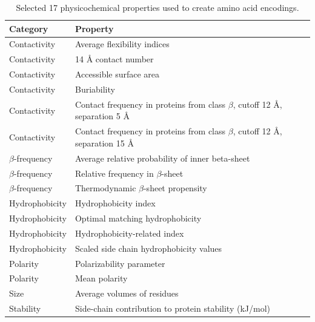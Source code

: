 \documentclass[fleqn,10pt,twoside]{gcb15submission}
\begin{document}
\begin{table}[bth]
\caption{Selected 17 physicochemical properties used to create amino acid encodings.} 
\label{tab:properties}
\small
\begin{tabularx}{\textwidth}{l X}
  \toprule
  Category & Property \\ 
  \midrule
  Contactivity & Average flexibility indices \citep{bhaskaran_positional_1988} 
\\ 
  \rowcolor[gray]{0.85}Contactivity & 14 {\AA} contact number 
\citep{nishikawa_radial_1986} \\ 
  Contactivity & Accessible surface area \citep{radzicka_comparing_1988} \\ 
  \rowcolor[gray]{0.85}Contactivity & Buriability \citep{zhou_quantifying_2004} 
\\ 
  Contactivity & Contact frequency in proteins from class $\beta$, cutoff 
12 {\AA}, separation 5 {\AA} \citep{wozniak_characteristics_2014} \\ 
  \rowcolor[gray]{0.85}Contactivity & Contact frequency in proteins from class 
$\beta$, cutoff 12 {\AA}, separation 15 {\AA}
\citep{wozniak_characteristics_2014} \\ 
\hline 
  $\beta$-frequency & Average relative probability of inner \newline beta-sheet 
\citep{kanehisa_local_1980} \\ 
  \rowcolor[gray]{0.85}$\beta$-frequency & Relative frequency in $\beta$-sheet 
\citep{prabhakaran_distribution_1990} \\ 
  $\beta$-frequency & Thermodynamic $\beta$-sheet propensity 
\citep{kim_thermodynamic_1993} \\ 
\hline 
 \rowcolor[gray]{0.85} Hydrophobicity & Hydrophobicity index 
\citep{argos_structural_1982} \\ 
  Hydrophobicity & Optimal matching hydrophobicity 
\citep{sweet_correlation_1983} \\ 
  \rowcolor[gray]{0.85}Hydrophobicity & Hydrophobicity-related index 
\citep{kidera_statistical_1985} \\ 
  Hydrophobicity & Scaled side chain hydrophobicity values 
\citep{black_development_1991} \\ 
\hline 
  \rowcolor[gray]{0.85}Polarity & Polarizability parameter 
\citep{charton_structural_1982} \\
  Polarity & Mean polarity \citep{radzicka_comparing_1988} \\ 
    \hline 
  \hline 
  \rowcolor[gray]{0.85}Size & Average volumes of residues 
\citep{pontius_deviations_1996} \\ 
\hline 
  Stability & Side-chain contribution to protein stability (kJ/mol) 
\citep{takano_new_2001} \\
  \bottomrule
\end{tabularx}
\end{table}
\end{document}
